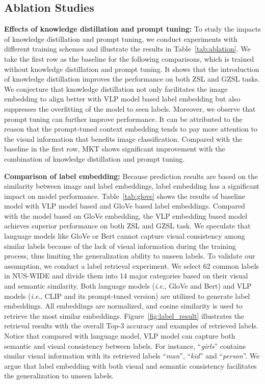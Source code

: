 \documentclass[letterpaper]{article} \usepackage{aaai23}  \usepackage{times}  \usepackage{helvet}  \usepackage{courier}  \usepackage[hyphens]{url}  \usepackage{graphicx} \urlstyle{rm} \def\UrlFont{\rm}  \usepackage{natbib}  \usepackage{caption} \frenchspacing  \setlength{\pdfpagewidth}{8.5in}  \setlength{\pdfpageheight}{11in}
\newcommand{\ie}{\textit{i}.\textit{e}.}
\begin{document}
\subsection{Ablation Studies}
\noindent\textbf{Effects of knowledge distillation and prompt tuning:}
To study the impacts of knowledge distillation and prompt tuning, 
we conduct experiments with different training schemes and illustrate the results in Table~\ref{tab:ablation}.
We take the first row as the baseline for the following comparisons, which is trained without knowledge distillation and prompt tuning.
It shows that the introduction of knowledge distillation improves the performance on both ZSL and GZSL tasks.
We conjecture that knowledge distillation not only facilitates the image embedding to align better with VLP model based label embedding but also suppresses the overfitting of the model to seen labels.
Moreover, we observe that prompt tuning can further improve performance.
It can be attributed to the reason that the prompt-tuned context embedding tends to pay more attention to the visual information that benefits image classification.
Compared with the baseline in the first row, MKT shows significant improvement with the combination of knowledge distillation and prompt tuning.


\noindent\textbf{Comparison of label embedding:}
Because prediction results are based on the similarity between image and label embeddings, label embedding has a significant impact on model performance.
Table~\ref{tab:glove} shows the results of baseline model with VLP model based and GloVe based label embeddings.
Compared with the model based on GloVe embedding, the VLP embedding based model achieves superior performance on both ZSL and GZSL task.
We speculate that language models like GloVe or Bert cannot capture visual consistency among similar labels because of the lack of visual information during the training process, thus limiting the generalization ability to unseen labels.
To validate our assumption, we conduct a label retrieval experiment.
We select 62 common labels in NUS-WIDE and divide them into 14 major categories based on their visual and semantic similarity. 
Both language models (\ie, GloVe and Bert) and VLP models (\ie, CLIP and its prompt-tuned version) are utilized to generate label embeddings.
All embeddings are normalized, and cosine similarity is used to retrieve the most similar embeddings.
Figure~\ref{fig:label_result} illustrates the retrieval results with the overall Top-3 accuracy and examples of retrieved labels.
Notice that compared with language model, VLP model can capture both semantic and visual consistency between labels.
For instance, ``\textit{girls}'' contains similar visual information with its retrieved labels ``\textit{man}'', ``\textit{kid}'' and ``\textit{person}''. 
We argue that label embedding with both visual and semantic consistency facilitates the generalization to unseen labels.
\end{document}
